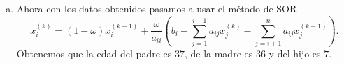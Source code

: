 \begin{frame}
	\begin{solution}
		\begin{enumerate}[b)]
			\item

			      Ahora con los datos obtenidos pasamos a usar el método de
			      SOR
			      \begin{equation*}
				      x_{i}^{\left(k\right)}=
				      \left(1-\omega\right)
				      x_{i}^{\left(k-1\right)}+
				      \dfrac{\omega}{a_{ii}}
				      \left(
				      b_{i}-
				      \sum\limits_{j=1}^{i-1}
				      a_{ij}x_{j}^{\left(k\right)}-
				      \sum\limits_{j=i+1}^{n}
				      a_{ij}x_{j}^{\left(k-1\right)}
				      \right).
			      \end{equation*}
			      Obtenemos que la edad del \alert{padre es $37$}, de la
			      \alert{madre es $36$} y del \alert{hijo es $7$}.
		\end{enumerate}
	\end{solution}
\end{frame}

\begin{frame}[fragile]
	\begin{columns}
		\begin{column}{0.48\textwidth}
			\inputminted[fontsize=\tiny,firstline=1,lastline=24]{python}{p4_sor.py}
		\end{column}
		\begin{column}{0.48\textwidth}
			\inputminted[fontsize=\tiny,firstline=26,lastline=52]{python}{p4_sor.py}
		\end{column}
	\end{columns}
\end{frame}

\begin{frame}[fragile]
	\begin{columns}
		\begin{column}{0.48\textwidth}
			\inputminted[fontsize=\tiny,firstline=1,lastline=29]{text}{p4_sor.txt}
		\end{column}
		\begin{column}{0.48\textwidth}
			\inputminted[fontsize=\tiny,firstline=30,lastline=53]{text}{p4_sor.txt}
		\end{column}
	\end{columns}
\end{frame}

